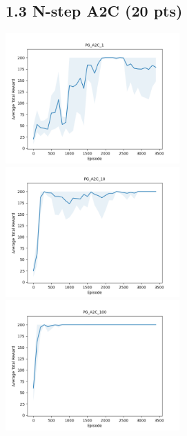 \documentclass[12pt]{article}
\begin{document}
\subsection*{1.3 N-step A2C (20 pts)}
\begin{solution}[height=20cm]
\begin{center}
    \includegraphics[width=0.5\textwidth,keepaspectratio]{code/pg/graphs/PG_A2C_1.png}
    \includegraphics[width=0.5\textwidth,keepaspectratio]{code/pg/graphs/PG_A2C_10.png}
    \includegraphics[width=0.5\textwidth,keepaspectratio]{code/pg/graphs/PG_A2C_100.png}
\end{center}
\end{solution}
\end{document}
